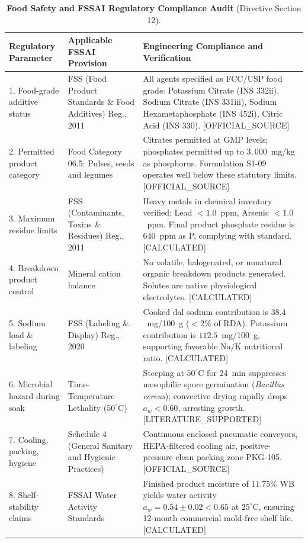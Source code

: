 \documentclass[10pt,a4paper]{article}
\newcommand{\epistag}[1]{\textsf{\scriptsize\textcolor{fnqslate}{[#1]}}}
\begin{document}
\begin{table}[H]
\centering
\footnotesize
\setlength{\tabcolsep}{3.0pt}
\caption{\textbf{Food Safety and FSSAI Regulatory Compliance Audit} (Directive Section 12).}
\label{tab:food_safety_audit}
\begin{tabularx}{\linewidth}{p{3.2cm}p{4.2cm}>{\raggedright\arraybackslash}X}
\toprule
\textbf{Regulatory Parameter} & \textbf{Applicable FSSAI Provision} & \textbf{Engineering Compliance and Verification} \\
\midrule
1. Food-grade additive status & FSS (Food Product Standards \& Food Additives) Reg., 2011 & All agents specified as FCC/USP food grade: Potassium Citrate (INS 332ii), Sodium Citrate (INS 331iii), Sodium Hexametaphosphate (INS 452i), Citric Acid (INS 330). \epistag{OFFICIAL\_SOURCE} \\
2. Permitted product category & Food Category 06.5: Pulses, seeds and legumes & Citrates permitted at GMP levels; phosphates permitted up to $3,000$~mg/kg as phosphorus. Formulation S1-09 operates well below these statutory limits. \epistag{OFFICIAL\_SOURCE} \\
3. Maximum residue limits & FSS (Contaminants, Toxins \& Residues) Reg., 2011 & Heavy metals in chemical inventory verified: Lead $< 1.0$~ppm, Arsenic $< 1.0$~ppm. Final product phosphate residue is $640$~ppm as P, complying with standard. \epistag{CALCULATED} \\
4. Breakdown product control & Mineral cation balance & No volatile, halogenated, or unnatural organic breakdown products generated. Solutes are native physiological electrolytes. \epistag{CALCULATED} \\
5. Sodium load \& labeling & FSS (Labeling \& Display) Reg., 2020 & Cooked dal sodium contribution is $38.4$~mg/100~g ($< 2\%$ of RDA). Potassium contribution is $112.5$~mg/100~g, supporting favorable $\mathrm{Na/K}$ nutritional ratio. \epistag{CALCULATED} \\
6. Microbial hazard during soak & Time-Temperature Lethality ($50^\circ\mathrm{C}$) & Steeping at $50^\circ\mathrm{C}$ for 24~min suppresses mesophilic spore germination (\textit{Bacillus cereus}); convective drying rapidly drops $a_w < 0.60$, arresting growth. \epistag{LITERATURE\_SUPPORTED} \\
7. Cooling, packing, hygiene & Schedule 4 (General Sanitary and Hygienic Practices) & Continuous enclosed pneumatic conveyors, HEPA-filtered cooling air, positive-pressure clean packing zone PKG-105. \epistag{OFFICIAL\_SOURCE} \\
8. Shelf-stability claims & FSSAI Water Activity Standards & Finished product moisture of $11.75\%$ WB yields water activity $a_w = 0.54 \pm 0.02 < 0.65$ at $25^\circ\mathrm{C}$, ensuring 12-month commercial mold-free shelf life. \epistag{CALCULATED} \\
\bottomrule
\end{tabularx}
\end{table}
\end{document}
